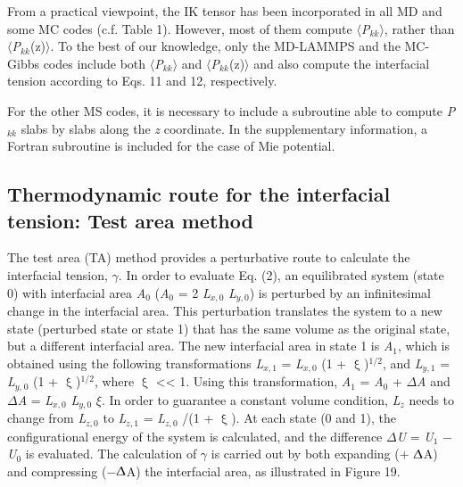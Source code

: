 \documentclass[9pt,bestpractices]{livecoms}
\begin{document}
From a practical viewpoint, the IK tensor has been incorporated in all MD and
some MC codes (c.f. Table 1). However, most of them compute
${\langle}$\textit{P}$_{kk}$${\rangle}$, rather than
${\langle}$\textit{P}$_{kk}$(z)${\rangle}$. To the best of our knowledge, only
the MD-LAMMPS and the MC-Gibbs codes include both
${\langle}$\textit{P}$_{kk}$${\rangle}$ and
${\langle}$\textit{P}$_{kk}$(z)${\rangle}$ and also compute the interfacial
tension according to Eqs. 11 and 12, respectively.

For the other MS codes, it is necessary to include a subroutine able to compute
\textit{P}$_{kk}$ slabs by slabs along the \textit{z} coordinate. In the
supplementary information, a Fortran subroutine is included for the case of Mie
potential. 

\subsection{Thermodynamic route for the interfacial tension: Test area method}

The test area (TA) method provides a perturbative route to calculate the
interfacial tension, {${\gamma}$}. In order to evaluate Eq. (2), an
equilibrated system (state 0) with interfacial area \textit{A}$_{0}$
(\textit{A}$_{0}$ = 2 \textit{L}$_{x,0}$ \textit{L}$_{y,0}$) is perturbed by an
infinitesimal change in the interfacial area. This perturbation translates the
system to a new state (perturbed state or state 1) that has the same volume as
the original state, but a different interfacial area. The new interfacial area
in state 1 is \textit{A}$_{1}$, which is obtained using the following
transformations \textit{L}$_{x,1}$ = \textit{L}$_{x,0}$ (1
+ {${\upxi}$})$^{\mathrm{1/2}}$, and \textit{L}$_{y,1}$
= \textit{L}$_{y,}$$_{0}$ (1 + {${\upxi}$})$^{\mathrm{ 1/2}}$, where
{${\upxi}$} {\textless}{\textless} 1. Using this transformation,
\textit{A}$_{1}$ = \textit{A}$_{0}$ + {${\Delta}$}\textit{A} and
{${\Delta}$}\textit{A} = \textit{L}$_{x,0}$ \textit{L}$_{y,0}$ {${\xi}$}. In
order to guarantee a constant volume condition, \textit{L}$_{z}$ needs to
change from \textit{L}$_{z,0}$ to \textit{L}$_{z,1}$ = \textit{L}$_{z,0}$ /(1
+ {${\upxi}$}). At each state (0 and 1), the configurational energy of the
system is calculated, and the difference {${\Delta}$}\textit{U}
= \textit{U}$_{1}$ ${-}$ \textit{U}$_{0}$ is evaluated. The calculation of
{${\gamma}$} is carried out by both expanding (+ {${\Updelta}$}A) and
compressing (${-}${${\Updelta}$}A) the interfacial area, as illustrated
in Figure 19.
\end{document}
